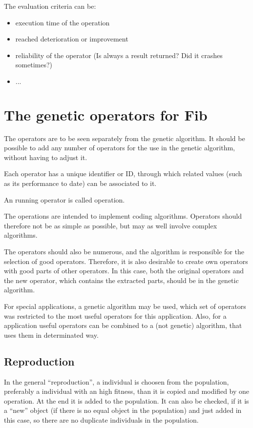 \bigskip\noindent
The evaluation criteria can be:
\begin{itemize}
 \item execution time of the operation
 \item reached deterioration or improvement
 \item reliability of the operator (Is always a result returned? Did it crashes sometimes?)
 \item ...
\end{itemize}


\section{The genetic operators for Fib}

The operators are to be seen separately from the genetic algorithm. It should be possible to add any number of operators for the use in the genetic algorithm, without having to adjust it.

Each operator has a unique identifier or ID, through which related values (such as its performance to date) can be associated to it.

An running operator is called operation.

The operations are intended to implement coding algorithms. Operators should therefore not be as simple as possible, but may as well involve complex algorithms.

The operators should also be numerous, and the algorithm is responsible for the selection of good operators. Therefore, it is also desirable to create own operators with good parts of other operators. In this case, both the original operators and the new operator, which contains the extracted parts, should be in the genetic algorithm.

For special applications, a genetic algorithm may be used, which set of operators was restricted to the most useful operators for this application.
Also, for a application useful operators can be combined to a (not genetic) algorithm, that uses them in determinated way.


\subsection{Reproduction}

In the general ``reproduction'', a individual is choosen from the population, preferably a individual with an high fitness, than it is copied and modified by one operation. At the end it is added to the population. It can also be checked, if it is a ``new'' object (if there is no equal object in the population) and just added in this case, so there are no duplicate individuals in the population.

